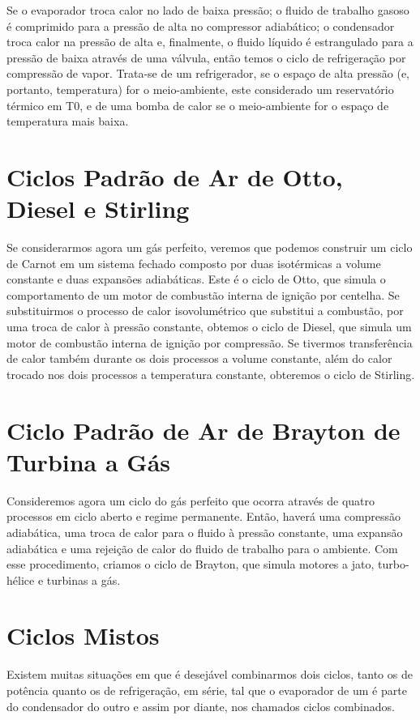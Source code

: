     Se o evaporador troca calor no lado de baixa pressão; o fluido de trabalho
    gasoso é comprimido para a pressão de alta no compressor adiabático; o
    condensador troca calor na pressão de alta e, finalmente, o fluido líquido
    é estrangulado para a pressão de baixa através de uma válvula, então temos
    o ciclo de refrigeração por compressão de vapor.  Trata-se de um
    refrigerador, se o espaço de alta pressão (e, portanto, temperatura) for o
    meio-ambiente, este considerado um reservatório térmico em T0, e de uma
    bomba de calor se o meio-ambiente for o espaço de temperatura mais baixa.

    \section{Ciclos Padrão de Ar de Otto, Diesel e Stirling}

    Se considerarmos agora um gás perfeito, veremos que podemos construir um
    ciclo de Carnot em um sistema fechado composto por duas isotérmicas a
    volume constante e duas expansões adiabáticas. Este é o ciclo de Otto, que
    simula o comportamento de um motor de combustão interna de ignição por
    centelha.  Se substituirmos o processo de calor isovolumétrico que
    substitui a combustão, por uma troca de calor à pressão constante, obtemos
    o ciclo de Diesel, que simula um motor de combustão interna de ignição por
    compressão.  Se tivermos transferência de calor também durante os dois
    processos a volume constante, além do calor trocado nos dois processos a
    temperatura constante, obteremos o ciclo de Stirling.

    \section{Ciclo Padrão de Ar de Brayton de Turbina a Gás}

    Consideremos agora um ciclo do gás perfeito que ocorra através de quatro
    processos em ciclo aberto e regime permanente. Então, haverá uma compressão
    adiabática, uma troca de calor para o fluido à pressão constante, uma
    expansão adiabática e uma rejeição de calor do fluido de trabalho para o
    ambiente. Com esse procedimento, criamos o ciclo de Brayton, que simula
    motores a jato, turbo-hélice e turbinas a gás.

    \section{Ciclos Mistos}

    Existem muitas situações em que é desejável combinarmos dois ciclos, tanto
    os de potência quanto  os de refrigeração, em série, tal que o evaporador
    de um é parte do condensador do outro e assim por diante, nos chamados
    ciclos combinados.
